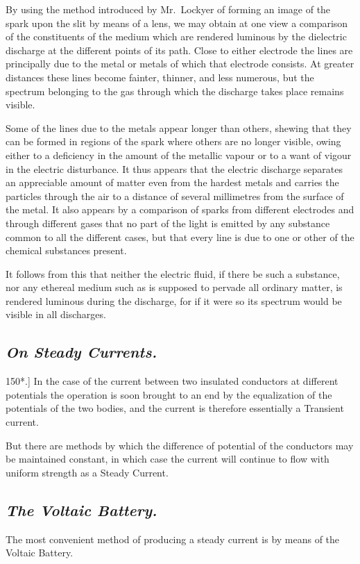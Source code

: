 \documentclass[12pt,oneside]{book}[2021/10/04]
\newcommand{\Heading}{\centering\normalfont}
\newcommand{\Subsection}[1]{\subsection*{\normalsize\Heading\itshape #1}}
\newcommand{\Runhead}[1]{\fancyhead[C]{\iffloatpage{}{\small#1}}}
\newcommand{\article}[1]{\phantomsection \label{art:#1}{#1.]}}
\newcommand{\¬}{\hphantom{0}}
\begin{document}
By using the method introduced by Mr.\ Lockyer of forming
an image of the spark upon the slit by means of a lens, we may
obtain at one view a comparison of the constituents of the medium
which are rendered luminous by the dielectric discharge at the
different points of its path. Close to either electrode the lines are
principally due to the metal or metals of which that electrode
consists. At greater distances these lines become fainter, thinner,
and less numerous, but the spectrum belonging to the gas through
which the discharge takes place remains visible.
\Runhead{SPECTRUM OF THE ELECTRIC SPARK.}

Some of the lines due to the metals appear longer than others,
shewing that they can be formed in regions of the spark where
others are no longer visible, owing either to a deficiency in the
amount of the metallic vapour or to a want of vigour in the electric
disturbance. It thus appears that the electric discharge separates
an appreciable amount of matter even from the hardest metals and
carries the particles through the air to a distance of several millimetres
from the surface of the metal. It also appears by a comparison
of sparks from different electrodes and through different
gases that no part of the light is emitted by any substance common
to all the different cases, but that every line is due to one or other
of the chemical substances present.

It follows from this that neither the electric fluid, if there be
such a substance, nor any ethereal medium such as is supposed
to pervade all ordinary matter, is rendered luminous during the
discharge, for if it were so its spectrum would be visible in all
discharges.

\Subsection{On Steady Currents.}

\article{150*} In the case of the current between two insulated conductors
at different potentials the operation is soon brought to an
end by the equalization of the potentials of the two bodies, and the
current is therefore essentially a Transient current.

But there are methods by which the difference of potential of
the conductors may be maintained constant, in which case the
current will continue to flow with uniform strength as a Steady
Current.

\Subsection{The Voltaic Battery.}

The most convenient method of producing a steady current is by
means of the Voltaic Battery.
\end{document}
